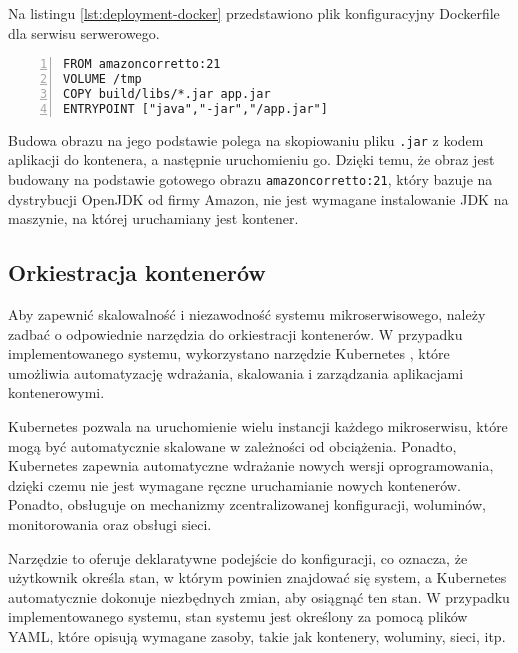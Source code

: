 Na listingu \ref{lst:deployment-docker} przedstawiono plik konfiguracyjny Dockerfile dla serwisu serwerowego.

\begin{lstlisting}[caption={Instrukcja budowania obrazu Docker serwisu serwerowego},label={lst:deployment-docker},captionpos=b,numbers=left]
FROM amazoncorretto:21
VOLUME /tmp
COPY build/libs/*.jar app.jar
ENTRYPOINT ["java","-jar","/app.jar"]
\end{lstlisting}

Budowa obrazu na jego podstawie polega na skopiowaniu pliku \texttt{.jar} z kodem aplikacji do kontenera, a następnie uruchomieniu go. Dzięki temu, że obraz jest budowany na podstawie gotowego obrazu \texttt{amazoncorretto:21}, który bazuje na dystrybucji OpenJDK od firmy Amazon, nie jest wymagane instalowanie JDK na maszynie, na której uruchamiany jest kontener.
    
\subsection{Orkiestracja kontenerów}

Aby zapewnić skalowalność i niezawodność systemu mikroserwisowego, należy zadbać o odpowiednie narzędzia do orkiestracji kontenerów. W przypadku implementowanego systemu, wykorzystano narzędzie Kubernetes \cite{k8s}, które umożliwia automatyzację wdrażania, skalowania i zarządzania aplikacjami kontenerowymi.

Kubernetes pozwala na uruchomienie wielu instancji każdego mikroserwisu, które mogą być automatycznie skalowane w zależności od obciążenia. Ponadto, Kubernetes zapewnia automatyczne wdrażanie nowych wersji oprogramowania, dzięki czemu nie jest wymagane ręczne uruchamianie nowych kontenerów. Ponadto, obsługuje on mechanizmy zcentralizowanej konfiguracji, woluminów, monitorowania oraz obsługi sieci.

Narzędzie to oferuje deklaratywne podejście do konfiguracji, co oznacza, że użytkownik określa stan, w którym powinien znajdować się system, a Kubernetes automatycznie dokonuje niezbędnych zmian, aby osiągnąć ten stan. W przypadku implementowanego systemu, stan systemu jest określony za pomocą plików YAML, które opisują wymagane zasoby, takie jak kontenery, woluminy, sieci, itp.

